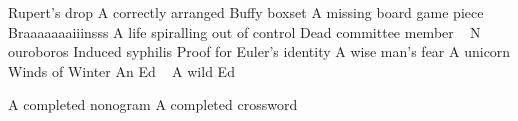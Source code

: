 \begin{multicols}{2}
\begin{small}
\begin{tabbing}
         {Rupert's drop}
              {A correctly arranged Buffy boxset}
           {A missing board game piece ~\E}
          {Braaaaaaaiiinsss}
         {A life spiralling out of control}
             {Dead committee member ~\E}
            {N ouroboros}
            {Induced syphilis}
            {Proof for Euler's identity}
            {A wise man's fear}
            {A unicorn}
            {Winds of Winter}
            {An Ed ~\E}
            {A wild Ed ~\E ~\FD}
       
          {A completed nonogram}
          {A completed crossword}
    \end{tabbing}
  \end{small}
\end{multicols}

\vfill

\begin{center}
\end{center}

\vfill

